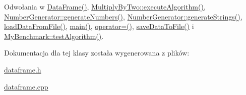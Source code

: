 Odwołania w \hyperlink{dataframe_8cpp_source_l00012}{Data\-Frame()}, \hyperlink{multiplybytwo_8cpp_source_l00011}{Multiply\-By\-Two\-::execute\-Algorithm()}, \hyperlink{numbergenerator_8h_source_l00035}{Number\-Generator\-::generate\-Numbers()}, \hyperlink{numbergenerator_8cpp_source_l00010}{Number\-Generator\-::generate\-Strings()}, \hyperlink{dataframe_8cpp_source_l00020}{load\-Data\-From\-File()}, \hyperlink{main_8cpp_source_l00018}{main()}, \hyperlink{dataframe_8cpp_source_l00044}{operator=()}, \hyperlink{dataframe_8cpp_source_l00032}{save\-Data\-To\-File()} i \hyperlink{mybenchmark_8cpp_source_l00012}{My\-Benchmark\-::test\-Algorithm()}.



Dokumentacja dla tej klasy została wygenerowana z plików\-:\begin{DoxyCompactItemize}
\item 
\hyperlink{dataframe_8h}{dataframe.\-h}\item 
\hyperlink{dataframe_8cpp}{dataframe.\-cpp}\end{DoxyCompactItemize}
